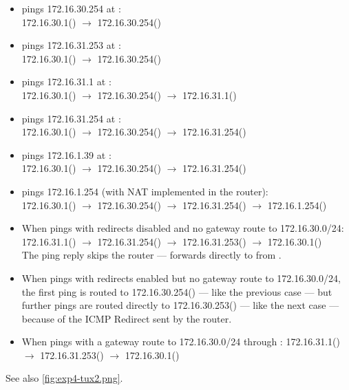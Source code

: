\documentclass[compilation.tex]{subfiles}
\begin{document}
\begin{itemize}[noitemsep,leftmargin=*,topsep=0pt]
\item {} pings 172.16.30.254 at :\\
172.16.30.1() $\rightarrow$ 172.16.30.254()
\item {} pings 172.16.31.253 at :\\
172.16.30.1() $\rightarrow$ 172.16.30.254()
\item {} pings 172.16.31.1 at :\\
172.16.30.1() $\rightarrow$ 172.16.30.254() $\rightarrow$ 172.16.31.1()
\item {} pings 172.16.31.254 at :\\
172.16.30.1() $\rightarrow$ 172.16.30.254() $\rightarrow$ 172.16.31.254()
\item {} pings 172.16.1.39 at :\\
172.16.30.1() $\rightarrow$ 172.16.30.254() $\rightarrow$ 172.16.31.254()
\item {} pings 172.16.1.254 (with NAT implemented in the router):\\
172.16.30.1() $\rightarrow$ 172.16.30.254() $\rightarrow$ 172.16.31.254() $\rightarrow$ 172.16.1.254()
\item When  pings  with redirects disabled and no gateway route to 172.16.30.0/24:
172.16.31.1() $\rightarrow$ 172.16.31.254() $\rightarrow$ 172.16.31.253() $\rightarrow$ 172.16.30.1()\\
The ping reply skips the router ---  forwards directly to  from .
\item When  pings  with redirects enabled but no gateway route to 172.16.30.0/24, the first ping is routed to 172.16.30.254() --- like the previous case --- but further pings are routed directly to 172.16.30.253() --- like the next case --- because of the ICMP Redirect sent by the router.
\item When  pings  with a gateway route to 172.16.30.0/24 through :
172.16.31.1() $\rightarrow$ 172.16.31.253() $\rightarrow$ 172.16.30.1()
\end{itemize}

See also \autoref{fig:exp4-tux2.png}.
\end{document}
